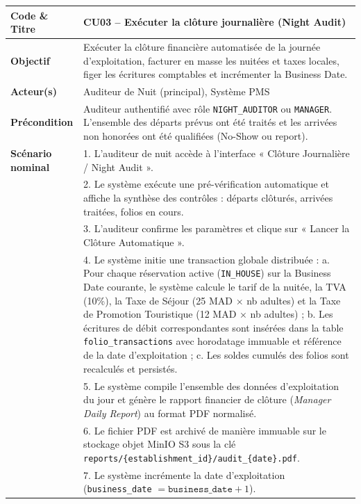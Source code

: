 \begin{table}[H]
\centering
\small
\renewcommand{\arraystretch}{1.2}
\begin{tabularx}{\textwidth}{|p{3.5cm}|X|}
\hline
\textbf{Code \& Titre} & \textbf{CU03 -- Exécuter la clôture journalière (Night Audit)} \\
\hline
\textbf{Objectif} & Exécuter la clôture financière automatisée de la journée d'exploitation, facturer en masse les nuitées et taxes locales, figer les écritures comptables et incrémenter la Business Date. \\
\hline
\textbf{Acteur(s)} & Auditeur de Nuit (principal), Système PMS \\
\hline
\textbf{Précondition} & Auditeur authentifié avec rôle \texttt{NIGHT\_AUDITOR} ou \texttt{MANAGER}. L'ensemble des départs prévus ont été traités et les arrivées non honorées ont été qualifiées (No-Show ou report). \\
\hline
\textbf{Scénario nominal} & 
1. L'auditeur de nuit accède à l'interface « Clôture Journalière / Night Audit ».\\
& 2. Le système exécute une pré-vérification automatique et affiche la synthèse des contrôles : départs clôturés, arrivées traitées, folios en cours.\\
& 3. L'auditeur confirme les paramètres et clique sur « Lancer la Clôture Automatique ».\\
& 4. Le système initie une transaction globale distribuée :
   a. Pour chaque réservation active (\texttt{IN\_HOUSE}) sur la Business Date courante, le système calcule le tarif de la nuitée, la TVA (10\%), la Taxe de Séjour (25 MAD $\times$ nb adultes) et la Taxe de Promotion Touristique (12 MAD $\times$ nb adultes) ;
   b. Les écritures de débit correspondantes sont insérées dans la table \texttt{folio\_transactions} avec horodatage immuable et référence de la date d'exploitation ;
   c. Les soldes cumulés des folios sont recalculés et persistés.\\
& 5. Le système compile l'ensemble des données d'exploitation du jour et génère le rapport financier de clôture (\textit{Manager Daily Report}) au format PDF normalisé.\\
& 6. Le fichier PDF est archivé de manière immuable sur le stockage objet MinIO S3 sous la clé \texttt{reports/\{establishment\_id\}/audit\_\{date\}.pdf}.\\
& 7. Le système incrémente la date d'exploitation (\texttt{business\_date} $= \texttt{business\_date} + 1$).\\

\end{tabularx}
\end{table}
